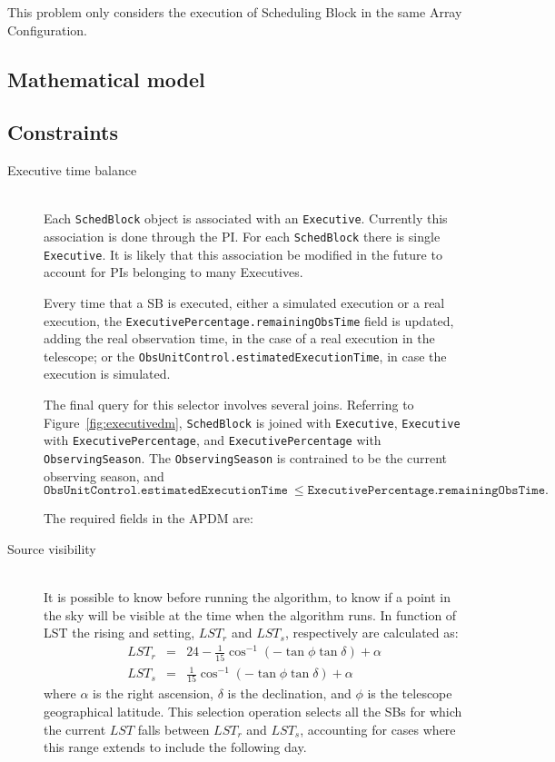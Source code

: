 This problem only considers the execution of Scheduling Block in the same Array Configuration.

\subsection{Mathematical model}

\subsection{Constraints}

\begin{description}

\item[Executive time balance] \hfil \\
Each \texttt{SchedBlock} object is associated with an \texttt{Executive}. Currently this association is
done through the PI. For each \texttt{SchedBlock} there is single \texttt{Executive}. It is likely that this
association be modified in the future to account for PIs belonging to many Executives.

Every time that a SB is executed, either a simulated execution or a real execution, the
\texttt{ExecutivePercentage.remainingObsTime} field is updated, adding the real observation time,
in the case of a real execution in the telescope; or the \texttt{ObsUnitControl.estimatedExecutionTime},
in case the execution is simulated.

The final query for this selector involves several joins. Referring to Figure~\ref{fig:executivedm},
\texttt{SchedBlock} is joined with \texttt{Executive}, \texttt{Executive} with \texttt{ExecutivePercentage}, and
\texttt{ExecutivePercentage} with \texttt{ObservingSeason}. The \texttt{ObservingSeason} is contrained to be
the current observing season, and
$$
\mathtt{ObsUnitControl.estimatedExecutionTime}\ \leq \mathtt{ExecutivePercentage.remainingObsTime}.
$$

The required fields in the APDM are:

\item[Source visibility] \hfill \\
It is possible to know before running the algorithm, to know if a point in the sky will be visible at the time when the algorithm runs.
In function of LST the rising and setting, $LST_r$ and $LST_s$, respectively are calculated as:
\begin{eqnarray*}
LST_r & = & 24 - \frac{1}{15} \cos^{-1} (-\tan\phi\tan\delta) + \alpha \\
LST_s & = & \frac{1}{15} \cos^{-1} (-\tan\phi \tan\delta) + \alpha
\end{eqnarray*}
where $\alpha$ is the right ascension, $\delta$ is the declination, and
$\phi$ is the telescope geographical latitude.
This selection operation selects all the SBs for which the current $LST$ falls
between $LST_r$ and $LST_s$, accounting for cases where this range extends to include
the following day.


\end{description}
